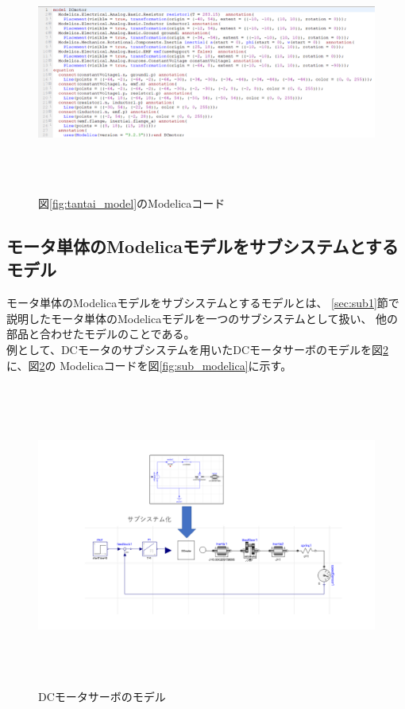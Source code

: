 \begin{figure}[t]
	\centering
	\includegraphics[width=16.5cm,height=8cm]{./Image/tantai_modelica.png}
	\caption{図\ref{fig:tantai_model}のModelicaコード}
	\label{fig:tantai_modelica}
  \end{figure}

  \vspace{-1zh}

\subsection{モータ単体のModelicaモデルをサブシステムとするモデル} %
モータ単体のModelicaモデルをサブシステム\cite{modelicaシステム本}とするモデルとは、
\ref{sec:sub1}節で説明したモータ単体のModelicaモデルを一つのサブシステムとして扱い、
他の部品と合わせたモデルのことである。\\
例として、DCモータのサブシステムを用いたDCモータサーボのモデルを図\ref{fig:submodel}に、図\ref{fig:submodel}の
Modelicaコードを図\ref{fig:sub_modelica}に示す。

\begin{figure}[t]
	\centering
	\includegraphics[width=16.5cm,height=10cm]{./Image/submodel_pack.png}
	\caption{DCモータサーボのモデル}
	\label{fig:submodel}
  \end{figure}

